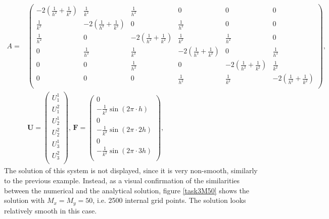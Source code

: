 \begin{equation*}
\begin{split}
    A = &\begin{pmatrix} 
    -2(\frac{1}{h^2}+\frac{1}{k^2}) & \frac{1}{k^2} & \frac{1}{h^2} & 0 & 0 & 0\\
    \frac{1}{k^2} & -2(\frac{1}{h^2}+\frac{1}{k^2}) & 0 & \frac{1}{h^2} & 0 & 0 \\
    \frac{1}{h^2} & 0 & -2(\frac{1}{h^2}+\frac{1}{k^2}) & \frac{1}{k^2} & \frac{1}{h^2} & 0 \\
    0 & \frac{1}{h^2} & \frac{1}{k^2} & -2(\frac{1}{h^2}+\frac{1}{k^2}) & 0 & \frac{1}{h^2} \\
    0 & 0 & \frac{1}{h^2} & 0 & -2(\frac{1}{h^2}+\frac{1}{k^2}) & \frac{1}{k^2} \\
    0 & 0 & 0 & \frac{1}{h^2} & \frac{1}{k^2} & -2(\frac{1}{h^2}+\frac{1}{k^2}) \\
    \end{pmatrix}, \\ &\boldsymbol{U} = \begin{pmatrix}
    U_1^1 \\
    U_1^2 \\
    U_2^1 \\
    U_2^2 \\
    U_3^1 \\
    U_3^2 \\
    \end{pmatrix}, \, \boldsymbol{F} = \begin{pmatrix}
    0 \\
    -\frac{1}{k^2}\sin{(2\pi \cdot h)} \\
    0 \\
    -\frac{1}{k^2}\sin{(2\pi \cdot 2h)} \\
    0 \\
    -\frac{1}{k^2}\sin{(2\pi \cdot 3h)} \\
    \end{pmatrix}, 
\end{split}
\end{equation*}
The solution of this system is not displayed, since it is very non-smooth, similarly to the previous example. Instead, as a visual confirmation of the similarities between the numerical and the analytical solution, figure \ref{task3M50} shows the solution with $M_x = M_y = 50$, i.e. 2500 internal grid points. The solution looks relatively smooth in this case. \newline 


